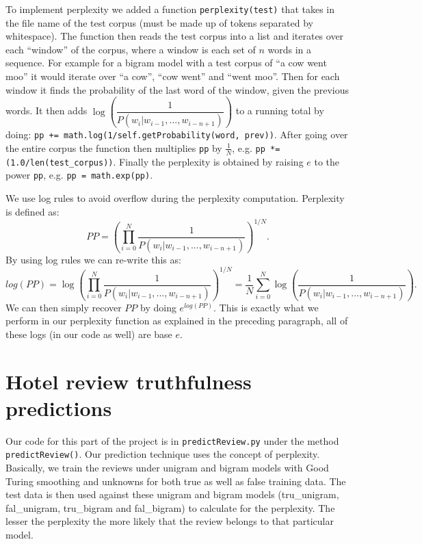 \documentclass{article}
\begin{document}
To implement perplexity we added a function \texttt{perplexity(test)} that takes in the file name of the test corpus (must be made up of tokens separated by whitespace). The function then reads the test corpus into a list and iterates over each ``window'' of the corpus, where a window is each set of $n$ words in a sequence. For example for a bigram model with a test corpus of ``a cow went moo'' it would iterate over ``a cow'', ``cow went'' and ``went moo''. Then for each window it finds the probability of the last word of the window, given the previous words. It then adds $\log\left(\dfrac{1}{P(w_i|w_{i-1},...,w_{i-n+1})}\right)$ to a running total by doing: \texttt{pp += math.log(1/self.getProbability(word, prev))}. After going over the entire corpus the function then multiplies \texttt{pp} by $\frac{1}{N}$, e.g. \texttt{pp *= (1.0/len(test\_corpus))}. Finally the perplexity is obtained by raising $e$ to the power \texttt{pp}, e.g. \texttt{pp = math.exp(pp)}.

We use log rules to avoid overflow during the perplexity computation.
Perplexity is defined as:
\[PP=\left(\prod_{i=0}^N\frac{1}{P(w_i|w_{i-1},...,w_{i-n+1})}\right)^{1/N}.\]
By using log rules we can re-write this as:
\[log(PP) = \log\left(\prod_{i=0}^N\frac{1}{P(w_i|w_{i-1},...,w_{i-n+1})}\right)^{1/N} = \frac{1}{N}\sum_{i=0}^N \log\left(\frac{1}{P(w_i|w_{i-1},...,w_{i-n+1})}\right).\] We can then simply recover $PP$ by doing $e^{log(PP)}$. This is exactly what we perform in our perplexity function as explained in the preceding paragraph, all of these logs (in our code as well) are base $e$.

\section{Hotel review truthfulness predictions} %
Our code for this part of the project is in \texttt{predictReview.py} under the method \texttt{predictReview()}. Our prediction technique uses the concept of perplexity. Basically, we train the reviews under unigram and bigram models with Good Turing smoothing and unknowns for both true as well as false training data. The test data is then used against these unigram and bigram models (tru\_unigram, fal\_unigram, tru\_bigram and fal\_bigram) to calculate for the perplexity. The lesser the perplexity the more likely that the review belongs to that particular model. \par
\end{document}

